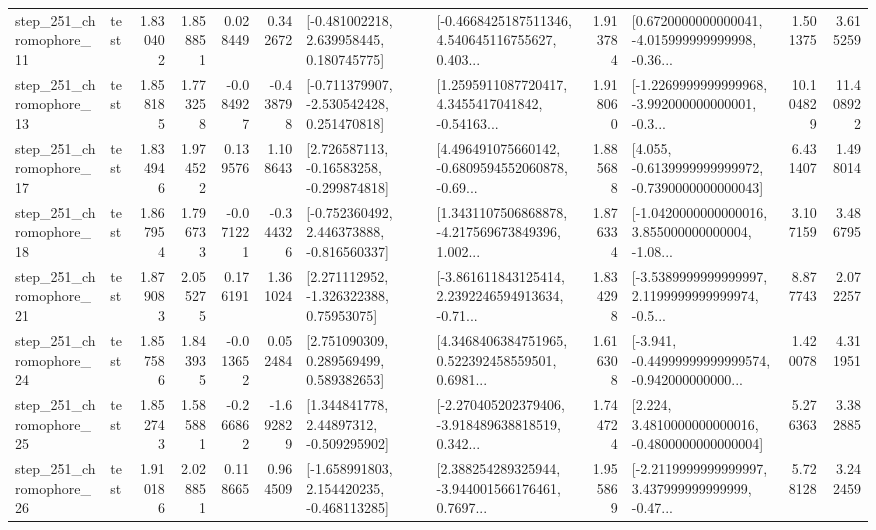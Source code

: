 \begin{tabular}{llrrrrllrlrr}
  step\_251\_chromophore\_11 &      test &      1.830402 &    1.858851 &      0.028449 &  0.342672 &    [-0.481002218, 2.639958445, 0.180745775] &  [-0.4668425187511346, 4.540645116755627, 0.403... &       1.913784 &  [0.6720000000000041, -4.015999999999998, -0.36... &            1.501375 &          3.615259 \\
  step\_251\_chromophore\_13 &      test &      1.858185 &    1.773258 &     -0.084927 & -0.438798 &   [-0.711379907, -2.530542428, 0.251470818] &  [1.2595911087720417, 4.3455417041842, -0.54163... &       1.918060 &  [-1.2269999999999968, -3.992000000000001, -0.3... &           10.104829 &         11.408922 \\
  step\_251\_chromophore\_17 &      test &      1.834946 &    1.974522 &      0.139576 &  1.108643 &    [2.726587113, -0.16583258, -0.299874818] &  [4.496491075660142, -0.6809594552060878, -0.69... &       1.885688 &  [4.055, -0.6139999999999972, -0.7390000000000043] &            6.431407 &          1.498014 \\
  step\_251\_chromophore\_18 &      test &      1.867954 &    1.796733 &     -0.071221 & -0.344326 &   [-0.752360492, 2.446373888, -0.816560337] &  [1.3431107506868878, -4.217569673849396, 1.002... &       1.876334 &  [-1.0420000000000016, 3.855000000000004, -1.08... &            3.107159 &          3.486795 \\
  step\_251\_chromophore\_21 &      test &      1.879083 &    2.055275 &      0.176191 &  1.361024 &     [2.271112952, -1.326322388, 0.75953075] &  [-3.861611843125414, 2.2392246594913634, -0.71... &       1.834298 &  [-3.5389999999999997, 2.1199999999999974, -0.5... &            8.877743 &          2.072257 \\
  step\_251\_chromophore\_24 &      test &      1.857586 &    1.843935 &     -0.013652 &  0.052484 &     [2.751090309, 0.289569499, 0.589382653] &  [4.3468406384751965, 0.522392458559501, 0.6981... &       1.616308 &  [-3.941, -0.44999999999999574, -0.942000000000... &            1.420078 &          4.311951 \\
  step\_251\_chromophore\_25 &      test &      1.852743 &    1.585881 &     -0.266862 & -1.692829 &     [1.344841778, 2.44897312, -0.509295902] &  [-2.270405202379406, -3.918489638818519, 0.342... &       1.744724 &   [2.224, 3.4810000000000016, -0.4800000000000004] &            5.276363 &          3.382885 \\
  step\_251\_chromophore\_26 &      test &      1.910186 &    2.028851 &      0.118665 &  0.964509 &   [-1.658991803, 2.154420235, -0.468113285] &  [2.388254289325944, -3.944001566176461, 0.7697... &       1.955869 &  [-2.2119999999999997, 3.437999999999999, -0.47... &            5.728128 &          3.242459 \\

\end{tabular}
